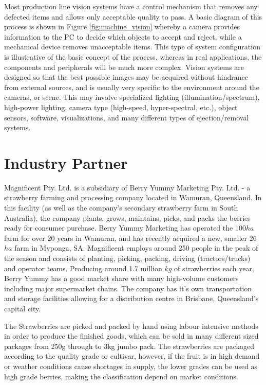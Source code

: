 \documentclass[fleqn,twoside,12pt]{report}
\begin{document}
Most production line vision systems have a control mechanism that removes any defected items and allows only acceptable quality to pass. A basic diagram of this process is shown in Figure \ref{fig:machine_vision} whereby a camera provides information to the PC to decide which objects to accept and reject, while a mechanical device removes unacceptable items. This type of system configuration is illustrative of the basic concept of the process, whereas in real applications, the components and peripherals will be much more complex. Vision systems are designed so that the best possible images may be acquired without hindrance from external sources, and is usually very specific to the environment around the cameras, or scene. This may involve specialized lighting (illumination/spectrum), high-power lighting, camera type (high-speed, hyper-spectral, etc.), object sensors, software, visualizations, and many different types of ejection/removal systems.



\section{Industry Partner}

Magnificent Pty. Ltd. is a subsidiary of Berry Yummy Marketing Pty. Ltd. - a strawberry farming and processing company located in Wamuran, Queensland. In this facility (as well as the company's secondary strawberry farm in South Australia), the company plants, grows, maintains, picks, and packs the berries ready for consumer purchase. Berry Yummy Marketing has operated the 100$ha$ farm for over 20 years in Wamuran, and has recently acquired a new, smaller 26$ha$ farm in Myponga, SA. Magnificent employs around 250 people in the peak of the season and consists of planting, picking, packing, driving (tractors/trucks) and operator teams. Producing around 1.7 million $kg$ of strawberries each year, Berry Yummy has a good market share with many high-volume customers including major supermarket chains. The company has it's own transportation and storage facilities allowing for a distribution centre in Brisbane, Queensland's capital city. 

The Strawberries are picked and packed by hand using labour intensive methods in order to produce the finished goods, which can be sold in many different sized packages from 250g through to 3kg jumbo pack. The strawberries are packaged according to the quality grade or cultivar, however, if the fruit is in high demand or weather conditions cause shortages in supply, the lower grades can be used as high grade berries, making the classification depend on market conditions.
\end{document}
